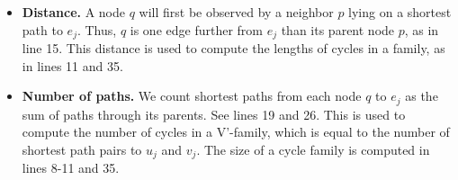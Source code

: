 \documentclass[fleqn,11pt]{article}
\begin{document}
\begin{itemize}
		\item \textbf{Distance.} %
		A node $q$ will first be observed by a neighbor $p$ lying on a shortest path to $e_j$. Thus, $q$ is one edge further from $e_j$ than its parent node $p$, as in line 15. This distance is used to compute the lengths of cycles in a family, as in lines 11 and 35. %
		\item \textbf{Number of paths.} %
		We count shortest paths from each node $q$ to $e_j$ as the sum of paths through its parents. See lines 19 and 26.
		This is used to compute the number of cycles in a V'-family, which is equal to the number of shortest path pairs to $u_j$ and $v_j$. 
		The size of a cycle family is computed in lines 8-11 and 35.

\end{itemize}
\end{document}
